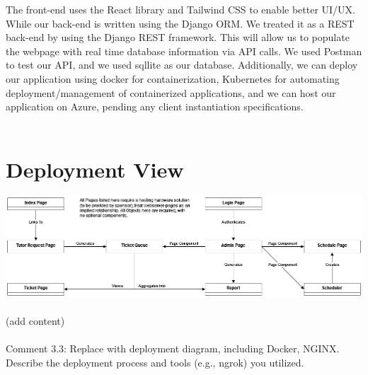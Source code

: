 \documentclass[oneside,openany,obeyspaces]{book}
\newcommand\tab[1][1cm]{\hspace*{#1}}
\begin{document}
\begin{flushleft}
    \tab The front-end uses the React library and Tailwind CSS to enable better UI/UX. While our back-end is written using the Django ORM. We treated it as a REST back-end by using the Django REST framework. This will allow us to populate the webpage with real time database information via API calls. We used Postman to test our API, and we used sqllite as our database. Additionally, we can deploy our application using docker for containerization, Kubernetes for automating deployment/management of containerized applications, and we can host our application on Azure, pending any client instantiation specifications.\\~\\


    \section{Deployment View}

    \includegraphics[width=160mm,scale=0.5]{img/UML Object Model.png}\\~\\

    \tab (add content)\\~\\
    {\color{red}Comment 3.3: Replace with deployment diagram, including Docker, NGINX. Describe the deployment process and tools (e.g., ngrok) you utilized.\\~\\}



\end{flushleft}
\end{document}
